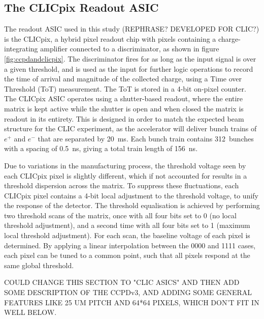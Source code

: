 
\subsection{The CLICpix Readout ASIC}

The readout ASIC used in this study (REPHRASE? DEVELOPED FOR CLIC?) is the CLICpix, a hybrid pixel readout chip with pixels containing a charge-integrating amplifier connected to a discriminator, as shown in figure \ref{fig:ccpdandclicpix}.  The discriminator fires for as long as the input signal is over a given threshold, and is used as the input for further logic operations to record the time of arrival and magnitude of the collected charge, using a Time over Threshold (ToT) measurement. The ToT is stored in a 4-bit on-pixel counter.  The CLICpix ASIC operates using a shutter-based readout, where the entire matrix is kept active while the shutter is open and when closed the matrix is readout in its entirety.  This is designed in order to match the expected beam structure for the CLIC experiment, as the accelerator will deliver bunch trains of $e^{+}$ and $e^{-}$ that are separated by 20~ms.  Each bunch train contains 312~bunches with a spacing of 0.5~ns, giving a total train length of 156~ns.  

Due to variations in the manufacturing process, the threshold voltage seen by each CLICpix pixel is slightly different, which if not accounted for results in a threshold dispersion across the matrix. To suppress these fluctuations, each CLICpix pixel contains a 4-bit local adjustment to the threshold voltage, to unify the response of the detector. The threshold equalisation is achieved by performing two threshold scans of the matrix, once with all four bits set to 0 (no local threshold adjustment), and a second time with all four bits set to 1 (maximum local threshold adjustment). For each scan, the baseline voltage of each pixel is determined. By applying a linear interpolation between the 0000 and 1111 cases, each pixel can be tuned to a common point, such that all pixels respond at the same global threshold.

COULD CHANGE THIS SECTION TO "CLIC ASICS" AND THEN ADD SOME DESCRIPTION OF THE CCPDv3, AND ADDING SOME GENERAL FEATURES LIKE 25 UM PITCH AND 64*64 PIXELS, WHICH DON'T FIT IN WELL BELOW.


